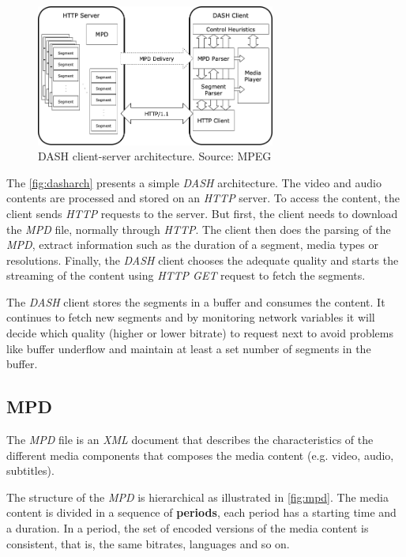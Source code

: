 \begin{figure}[h]
  \centering
  \includegraphics[width=0.7\textwidth]{img/dasharch.png}
  \caption{DASH client-server architecture. Source: MPEG \cite{ios1}}
  \label{fig:dasharch}
\end{figure}

The \autoref{fig:dasharch} presents a simple \textit{DASH} architecture. The video and audio
contents are processed and stored on an \textit{HTTP} server. To access the content, the client
sends \textit{HTTP} requests to the server. But first, the client needs to download the 
\textit{MPD} file, normally through \textit{HTTP}. The client then does the
parsing of the \textit{MPD}, extract information such as the duration of a segment, media types or 
resolutions. Finally, the \textit{DASH} client chooses the adequate quality and starts the 
streaming of the content using \textit{HTTP GET} request to fetch the segments.

The \textit{DASH} client stores the segments in a buffer and consumes the content. It continues
to fetch new segments and by monitoring network variables it will decide which quality (higher
or lower bitrate) to request next to avoid problems like buffer underflow and maintain at 
least a set number of segments in the buffer.

\subsection{MPD}
\label{sec:mpd}
The \textit{MPD} file is an \textit{XML} document that describes the characteristics
of the different media components that composes the media content (e.g. video, audio, subtitles).

The structure of the \textit{MPD} is hierarchical as illustrated in \autoref{fig:mpd}. The media content is divided in a sequence of
\textbf{periods}, each period has a starting time and a duration. In a period, the set of encoded
versions of the media content is consistent, that is, the same bitrates, languages and so on.

